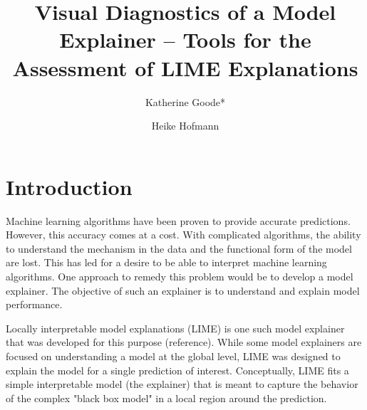 \documentclass[AMS,STIX1COL]{WileyNJD-v2}
\begin{document}


\title{Visual Diagnostics of a Model Explainer -- Tools for the Assessment of LIME Explanations}

\author[1]{Katherine Goode*}

\author[1,2]{Heike Hofmann}


\address[1]{, , }

\address[2]{, , }






\maketitle

\section{Introduction}

Machine learning algorithms have been proven to provide accurate predictions. However, this accuracy comes at a cost. With complicated algorithms, the ability to understand the mechanism in the data and the functional form of the model are lost. This has led for a desire to be able to interpret machine learning algorithms. One approach to remedy this problem would be to develop a model explainer. The objective of such an explainer is to understand and explain model performance.

Locally interpretable model explanations (LIME) is one such model explainer that was developed for this purpose (reference). While some model explainers are focused on understanding a model at the global level, LIME was designed to explain the model for a single prediction of interest. Conceptually, LIME fits a simple interpretable model (the explainer) that is meant to capture the behavior of the complex "black box model" in a local region around the prediction. 
\end{document}
